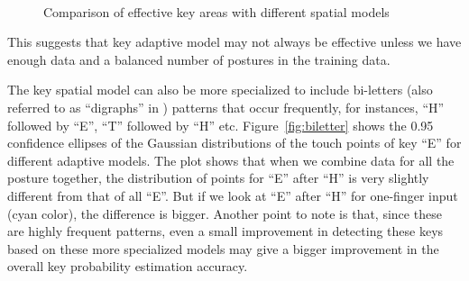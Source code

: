 \documentclass{sigchi}
\begin{document}
\begin{figure}[tb]
  \centering
   ~
  \caption{Comparison of effective key areas with different spatial models}
  \label{fig:key-boundary}
\end{figure}

This suggests that key adaptive model may not always be effective unless we
have enough data and a balanced number of postures in the training data. 

The key spatial model can also be more specialized to include bi-letters
(also referred to as ``digraphs'' in \cite{Zhai:2000}) patterns that occur
frequently, for instances, ``H'' followed by ``E'', ``T'' followed by ``H'' etc.
Figure~\ref{fig:biletter} shows the 0.95 confidence ellipses of the Gaussian
distributions of the touch points of key ``E'' for different adaptive models. The plot shows that when we combine data
for all the posture together, the distribution of points for ``E'' after ``H'' is
very slightly different from that of all ``E''. But if we look at ``E'' after
``H'' for one-finger input (cyan color), the difference is bigger. Another point 
to note is that, since these are highly frequent patterns, even a small 
improvement in detecting these keys based on these more specialized models may 
give a bigger improvement in the overall key probability estimation accuracy.
\end{document}
